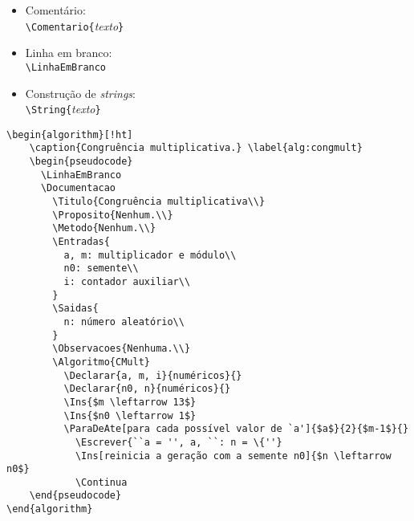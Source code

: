 \documentclass[a4paper,12pt,oneside,onecolumn]{article}
\newcommand{\comando}[1]{\texttt{\textbackslash #1}}
\newcommand{\param}[1]{\texttt{\{}\textsl{#1}\texttt{\}}}
\begin{document}
\begin{itemize}
  \item Comentário:\\
    \comando{Comentario}\param{texto}
  \item Linha em branco:\\
    \comando{LinhaEmBranco}
  \item Construção de \textsl{strings}:\\
    \comando{String}\param{texto}
\end{itemize}


\begin{verbatim}
\begin{algorithm}[!ht]
    \caption{Congruência multiplicativa.} \label{alg:congmult}
    \begin{pseudocode}
      \LinhaEmBranco
      \Documentacao
        \Titulo{Congruência multiplicativa\\}
        \Proposito{Nenhum.\\}
        \Metodo{Nenhum.\\}
        \Entradas{
          a, m: multiplicador e módulo\\
          n0: semente\\
          i: contador auxiliar\\
        }
        \Saidas{
          n: número aleatório\\
        }
        \Observacoes{Nenhuma.\\}
        \Algoritmo{CMult}
          \Declarar{a, m, i}{numéricos}{}
          \Declarar{n0, n}{numéricos}{}
          \Ins{$m \leftarrow 13$}
          \Ins{$n0 \leftarrow 1$}
          \ParaDeAte[para cada possível valor de `a']{$a$}{2}{$m-1$}{}
            \Escrever{``a = '', a, ``: n = \{''}
            \Ins[reinicia a geração com a semente n0]{$n \leftarrow n0$}
            \Continua
    \end{pseudocode}
\end{algorithm}
\end{verbatim}
\end{document}
